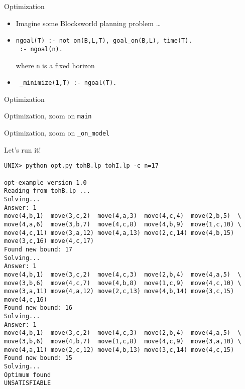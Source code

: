 \begin{frame}[fragile]{Optimization}
  \bigskip
  \begin{itemize}
  \item Imagine some Blocksworld planning problem \dots
    \smallskip
  \item {}
\begin{lstlisting}[language=clingo,basicstyle=\ttfamily\small]
 ngoal(T) :- not on(B,L,T), goal_on(B,L), time(T).
 :- ngoal(n).
\end{lstlisting}
    where \texttt{n} is a fixed horizon
    \medskip
  \item<2-> 
\begin{lstlisting}
 _minimize(1,T) :- ngoal(T).
\end{lstlisting}
  \end{itemize}
\end{frame}
\begin{frame}{Optimization}
  
\end{frame}
\begin{frame}[fragile,shrink=37]{Optimization, zoom on \texttt{main}}
  \bigskip
  
\end{frame}
\begin{frame}[fragile,shrink=25]{Optimization, zoom on \texttt{\_on\_model}}
  \bigskip
  
\end{frame}
\begin{frame}{Let's run it!}
\scriptsize\medskip
\begin{lstlisting}
UNIX> python opt.py tohB.lp tohI.lp -c n=17

opt-example version 1.0
Reading from tohB.lp ...
Solving...
Answer: 1
move(4,b,1)  move(3,c,2)  move(4,a,3)  move(4,c,4)  move(2,b,5)  \
move(4,a,6)  move(3,b,7)  move(4,c,8)  move(4,b,9)  move(1,c,10) \
move(4,c,11) move(3,a,12) move(4,a,13) move(2,c,14) move(4,b,15)
move(3,c,16) move(4,c,17)
Found new bound: 17
Solving...
Answer: 1
move(4,b,1)  move(3,c,2)  move(4,c,3)  move(2,b,4)  move(4,a,5)  \
move(3,b,6)  move(4,c,7)  move(4,b,8)  move(1,c,9)  move(4,c,10) \
move(3,a,11) move(4,a,12) move(2,c,13) move(4,b,14) move(3,c,15)
move(4,c,16)
Found new bound: 16
Solving...
Answer: 1
move(4,b,1)  move(3,c,2)  move(4,c,3)  move(2,b,4)  move(4,a,5)  \
move(3,b,6)  move(4,b,7)  move(1,c,8)  move(4,c,9)  move(3,a,10) \
move(4,a,11) move(2,c,12) move(4,b,13) move(3,c,14) move(4,c,15)
Found new bound: 15
Solving...
Optimum found
UNSATISFIABLE
\end{lstlisting}
\end{frame}
%
